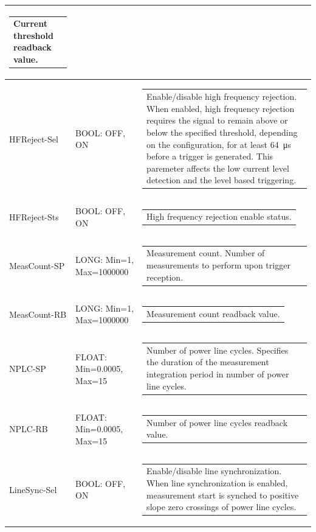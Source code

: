 \documentclass[openany]{article}
\begin{document}
\begin{longtable}{| m{3.0cm} m{4.5cm} m{7.0cm} |}
\begin{tabular}{@{}m{6cm}@{}}
	    					Current threshold readback value.
						\end{tabular} \\ \hline
		HFReject-Sel & BOOL: OFF, ON & \begin{tabular}{@{}m{6cm}@{}}
	    					Enable/disable high frequency rejection. When enabled, high frequency rejection requires the signal to remain above or below the specified threshold, depending on the configuration, for at least \SI{64}{\micro\second} before a trigger is generated. This paremeter affects the low current level detection and the level based triggering.
						\end{tabular} \\ \hline
		HFReject-Sts & BOOL: OFF, ON & \begin{tabular}{@{}m{6cm}@{}}
	    					High frequency rejection enable status.
						\end{tabular} \\ \hline
		MeasCount-SP & LONG: Min=1, Max=1000000 & \begin{tabular}{@{}m{6cm}@{}}
	    					Measurement count. Number of measurements to perform upon trigger reception.
						\end{tabular} \\ \hline
		MeasCount-RB & LONG: Min=1, Max=1000000 & \begin{tabular}{@{}m{6cm}@{}}
	    					Measurement count readback value.
						\end{tabular} \\ \hline
		NPLC-SP & FLOAT: Min=0.0005, Max=15 & \begin{tabular}{@{}m{6cm}@{}}
	    					Number of power line cycles. Specifies the duration of the measurement integration period in number of power line cycles.
						\end{tabular} \\ \hline
		NPLC-RB & FLOAT: Min=0.0005, Max=15 & \begin{tabular}{@{}m{6cm}@{}}
	    					Number of power line cycles readback value.
						\end{tabular} \\ \hline
		LineSync-Sel & BOOL: OFF, ON & \begin{tabular}{@{}m{6cm}@{}}
	    					Enable/disable line synchronization. When line synchronization is enabled, measurement start is synched to positive slope zero crossings of power line cycles.
						\end{tabular} \\ \hline

\end{longtable}
\end{document}
